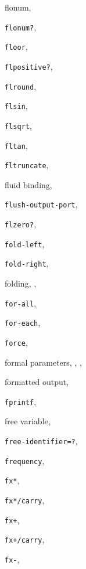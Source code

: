 {\begin{multicols}{2}
flonum, \pageref{objects_s176}
  
\texttt{flonum?}, \textit{\pageref{objects_s177}}
  
\texttt{floor}, \textit{\pageref{objects_s102}}
  
\texttt{flpositive?}, \textit{\pageref{objects_s179}}
  
\texttt{flround}, \textit{\pageref{objects_s190}}
  
\texttt{flsin}, \textit{\pageref{objects_s194}}
  
\texttt{flsqrt}, \textit{\pageref{objects_s196}}
  
\texttt{fltan}, \textit{\pageref{objects_s194}}
  
\texttt{fltruncate}, \textit{\pageref{objects_s190}}
  
fluid binding, \pageref{control_s61}
  
\texttt{flush-output-port}, \textit{\pageref{io_s74}}
  
\texttt{flzero?}, \textit{\pageref{objects_s179}}
  
\texttt{fold-left}, \textit{\pageref{control_s38}}
  
\texttt{fold-right}, \textit{\pageref{control_s41}}
  
folding, \pageref{control_s39}, \pageref{control_s42}
  
\texttt{for-all}, \textit{\pageref{control_s37}}
  
\texttt{for-each}, \textit{\pageref{control_s33}}
  
\texttt{force}, \textit{\pageref{control_s65}}
  
formal parameters, \pageref{start_s62}, \pageref{start_s70}, \pageref{binding_s5}
  
formatted output, \pageref{examples_s37}
  
\texttt{fprintf}, \pageref{examples_s38}
  
free variable, \pageref{start_s68}
  
\texttt{free-identifier=?}, \textit{\pageref{syntax_s37}}
  
\texttt{frequency}, \pageref{examples_s24}
  
\texttt{fx*}, \textit{\pageref{objects_s159}}
  
\texttt{fx*/carry}, \textit{\pageref{objects_s162}}
  
\texttt{fx+}, \textit{\pageref{objects_s157}}
  
\texttt{fx+/carry}, \textit{\pageref{objects_s162}}
  
\texttt{fx-}, \textit{\pageref{objects_s158}}
  

\end{multicols}}
